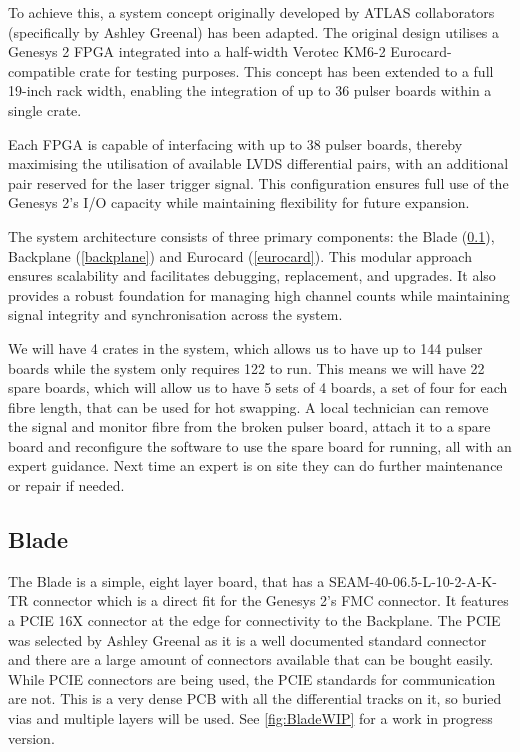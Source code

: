 \documentclass[a4paper,11pt]{article}
\begin{document}
To achieve this, a system concept originally developed by ATLAS collaborators (specifically by Ashley Greenal) has been adapted. The original design utilises a Genesys 2 FPGA integrated into a half-width Verotec KM6-2 \cite{KM6-2} Eurocard-compatible crate for testing purposes. This concept has been extended to a full 19-inch rack width, enabling the integration of up to 36 pulser boards within a single crate.

Each FPGA is capable of interfacing with up to 38 pulser boards, thereby maximising the utilisation of available LVDS differential pairs, with an additional pair reserved for the laser trigger signal. This configuration ensures full use of the Genesys 2’s I/O capacity while maintaining flexibility for future expansion.

The system architecture consists of three primary components: the Blade (\cref{blade}), Backplane (\cref{backplane}) and Eurocard (\cref{eurocard}). This modular approach ensures scalability and facilitates debugging, replacement, and upgrades. It also provides a robust foundation for managing high channel counts while maintaining signal integrity and synchronisation across the system.

We will have 4 crates in the system, which allows us to have up to 144 pulser boards while the system only requires 122 to run. This means we will have 22 spare boards, which will allow us to have 5 sets of 4 boards, a set of four for each fibre length, that can be used for hot swapping. A local technician can remove the signal and monitor fibre from the broken pulser board, attach it to a spare board and reconfigure the software to use the spare board for running, all with an expert guidance. Next time an expert is on site they can do further maintenance or repair if needed. 

\subsection{Blade}\label{blade}

The Blade is a simple, eight layer board, that has a SEAM-40-06.5-L-10-2-A-K-TR \cite{SamtecSeam} connector which is a direct fit for the Genesys 2's FMC connector. It features a PCIE 16X connector at the edge for connectivity to the Backplane. The PCIE was selected by Ashley Greenal as it is a well documented standard connector and there are a large amount of connectors available that can be bought easily. While PCIE connectors are being used, the PCIE standards for communication are not. This is a very dense PCB with all the differential tracks on it, so buried vias and multiple layers will be used. See \cref{fig:BladeWIP} for a work in progress version.
\end{document}
